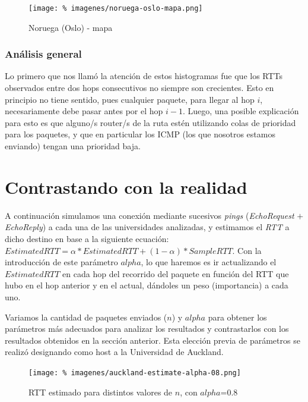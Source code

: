 \documentclass[final,inline,a4paper,narroweqnarray]{ieee}
\begin{document}
\begin{figure}[ht]\begin{center}
   \texttt{[image: \%
    imagenes/noruega-oslo-mapa.png]}
    \caption{Noruega (Oslo) - mapa}
    \label{Noruega}
\end{center}\end{figure}

\subsubsection{Análisis general}
Lo primero que nos llamó la atención de estos histogramas fue que los RTTs observados entre dos
hops consecutivos no siempre son crecientes. Esto en principio no tiene sentido, pues cualquier
paquete, para llegar al hop $i$, necesariamente debe pasar antes por el hop $i-1$. Luego,
una posible explicación para esto es que alguno/s router/s de la ruta estén utilizando colas
de prioridad para los paquetes, y que en particular los ICMP (los que nosotros estamos enviando)
tengan una prioridad baja.

\section{Contrastando con la realidad}
A continuación simulamos una conexión mediante sucesivos \emph{pings} (\emph{EchoRequest} $+$
\emph{EchoReply})
a cada una de las universidades analizadas, y estimamos el \emph{RTT} a dicho destino
en base a la siguiente ecuación:
$ EstimatedRTT = \alpha * EstimatedRTT + (1 - \alpha) * SampleRTT $. Con la introducción de
este parámetro $alpha$, lo que haremos es ir actualizando el $EstimatedRTT$ en cada hop del
recorrido del paquete en función del RTT que hubo en el hop anterior y en el actual, dándoles
un peso (importancia) a cada uno.

Variamos la cantidad de paquetes enviados ($n$) y $alpha$ para obtener los parámetros más
adecuados para analizar los resultados y contrastarlos con los resultados obtenidos en la sección anterior.
Esta elección previa de parámetros se realizó designando como host a la Universidad de Auckland.

\begin{figure}[ht]\begin{center}
   \texttt{[image: \%
    imagenes/auckland-estimate-alpha-08.png]}
    \caption{RTT estimado para distintos valores de $n$, con $alpha$=0.8}
    \label{fig:auckland-estimate-alpha-08}
\end{center}\end{figure}
\end{document}
